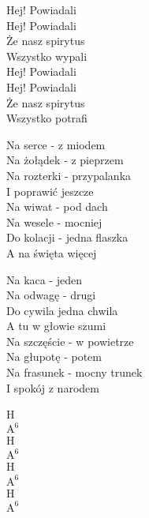 \begin{text}
    \vin Hej! Powiadali\\
    \vin Hej! Powiadali\\
    \vin Że nasz spirytus\\
    \vin Wszystko wypali\\
    \vin Hej! Powiadali\\
    \vin Hej! Powiadali\\
    \vin Że nasz spirytus\\
    \vin Wszystko potrafi

    Na serce - z miodem\\
    Na żołądek - z pieprzem\\
    Na rozterki - przypalanka\\
    I poprawić jeszcze\\
    Na wiwat - pod dach\\
    Na wesele - mocniej\\
    Do kolacji - jedna flaszka\\
    A na święta więcej

    Na kaca - jeden\\
    Na odwagę - drugi\\
    Do cywila jedna chwila\\
    A tu w głowie szumi\\
    Na szczęście - w powietrze\\
    Na głupotę - potem\\
    Na frasunek - mocny trunek\\
    I spokój z narodem
\end{text}
\begin{chord}
    H\\
    $\mathrm{A^{6}}$\\
    H\\
    $\mathrm{A^{6}}$\\
    H\\
    $\mathrm{A^{6}}$\\
    H\\
    $\mathrm{A^{6}}$
\end{chord}
